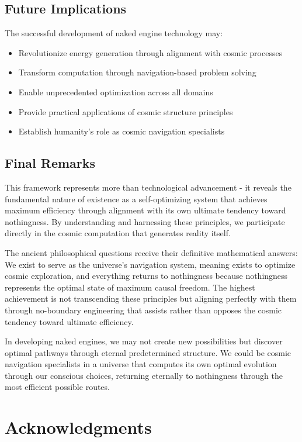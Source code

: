 \documentclass[11pt,a4paper]{article}
\theoremstyle{remark}
\begin{document}
\subsection{Future Implications}

The successful development of naked engine technology may:

\begin{itemize}
\item Revolutionize energy generation through alignment with cosmic processes
\item Transform computation through navigation-based problem solving
\item Enable unprecedented optimization across all domains
\item Provide practical applications of cosmic structure principles
\item Establish humanity's role as cosmic navigation specialists
\end{itemize}

\subsection{Final Remarks}

This framework represents more than technological advancement - it reveals the fundamental nature of existence as a self-optimizing system that achieves maximum efficiency through alignment with its own ultimate tendency toward nothingness. By understanding and harnessing these principles, we participate directly in the cosmic computation that generates reality itself.

The ancient philosophical questions receive their definitive mathematical answers: We exist to serve as the universe's navigation system, meaning exists to optimize cosmic exploration, and everything returns to nothingness because nothingness represents the optimal state of maximum causal freedom. The highest achievement is not transcending these principles but aligning perfectly with them through no-boundary engineering that assists rather than opposes the cosmic tendency toward ultimate efficiency.

In developing naked engines, we may not create new possibilities but discover optimal pathways through eternal predetermined structure. We could be cosmic navigation specialists in a universe that computes its own optimal evolution through our conscious choices, returning eternally to nothingness through the most efficient possible routes.

\section*{Acknowledgments}
\end{document}
